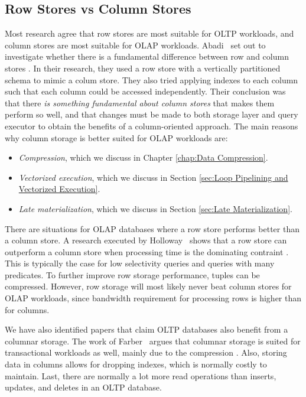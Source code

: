 \subsection{Row Stores vs Column Stores}
\label{sub:Row Stores vs Column Stores}
Most research agree that row stores are most suitable for OLTP workloads, and column stores are most suitable for OLAP workloads. Abadi \ea~set out to investigate whether there is a fundamental difference between row and column stores \cite{Abadi2008-dd}. In their research, they used a row store with a vertically partitioned schema to mimic a colum store. They also tried applying indexes to each column such that each column could be accessed independently. Their conclusion was that there \textit{is something fundamental about column stores} that makes them perform so well, and that changes must be made to both storage layer and query executor to obtain the benefits of a column-oriented approach. The main reasons why column storage is better suited for OLAP workloads are:
\begin{itemize}
  \item \textit{Compression}, which we discuss in Chapter \ref{chap:Data Compression}.
  \item \textit{Vectorized execution}, which we discuss in Section \ref{sec:Loop Pipelining and Vectorized Execution}.
  \item \textit{Late materialization}, which we discuss in Section \ref{sec:Late Materialization}.
\end{itemize}

There are situations for OLAP databases where a row store performs better than a column store. A research executed by Holloway \ea~shows that a row store can outperform a column store when processing time is the dominating contraint \cite{Holloway2008-rr}. This is typically the case for low selectivity queries and queries with many predicates. To further improve row storage performance, tuples can be compressed. However, row storage will most likely never beat column stores for OLAP workloads, since bandwidth requirement for processing rows is higher than for columns.


We have also identified papers that claim OLTP databases also benefit from a columnar storage. The work of Farber \ea~argues that columnar storage is suited for transactional workloads as well, mainly due to the compression \cite{Farber2012-vh}. Also, storing data in columns allows for dropping indexes, which is normally costly to maintain. Last, there are normally a lot more read operations than inserts, updates, and deletes in an OLTP database.

